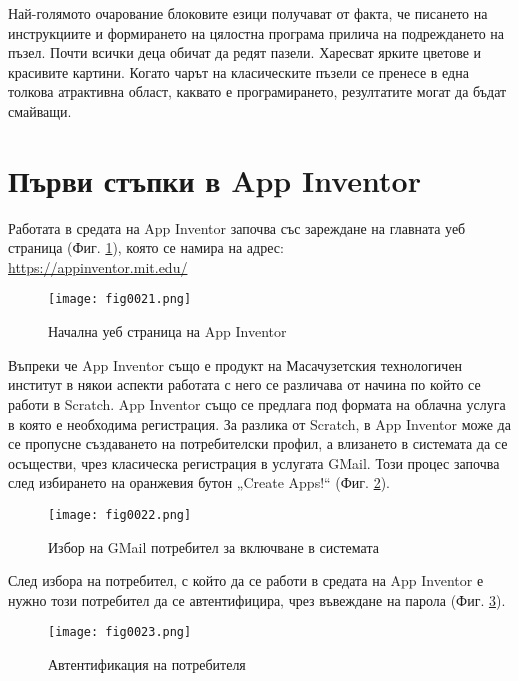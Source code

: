 Най-голямото очарование блоковите езици получават от факта, че писането на инструкциите и формирането на цялостна програма прилича на подреждането на пъзел. Почти всички деца обичат да редят пазели. Харесват ярките цветове и красивите картини. Когато чарът на класическите пъзели се пренесе в една толкова атрактивна област, каквато е програмирането, резултатите могат да бъдат смайващи. 

\section{Първи стъпки в App Inventor}

Работата в средата на App Inventor започва със зареждане на главната уеб страница (Фиг. \ref{fig0021}), която се намира на адрес: \\ \href{https://appinventor.mit.edu/}{https://appinventor.mit.edu/}

\begin{figure}[H]
  \centering
  \texttt{[image: fig0021.png]}
  \caption{Начална уеб страница на App Inventor}
\label{fig0021}
\end{figure}

Въпреки че App Inventor също е продукт на Масачузетския технологичен институт в някои аспекти работата с него се различава от начина по който се работи в Scratch. App Inventor също се предлага под формата на облачна услуга в която е необходима регистрация. За разлика от  Scratch, в App Inventor може да се пропусне създаването на потребителски профил, а влизането в системата да се осъществи, чрез класическа регистрация в услугата GMail. Този процес започва след избирането на оранжевия бутон „Create Apps!“ (Фиг. \ref{fig0022}).

\begin{figure}[H]
  \centering
  \texttt{[image: fig0022.png]}
  \caption{Избор на GMail потребител за включване в системата}
\label{fig0022}
\end{figure}

След избора на потребител, с който да се работи в средата на App Inventor е нужно този потребител да се автентифицира, чрез въвеждане на парола (Фиг. \ref{fig0023}).

\begin{figure}[H]
  \centering
  \texttt{[image: fig0023.png]}
  \caption{Автентификация на потребителя}
\label{fig0023}
\end{figure}

